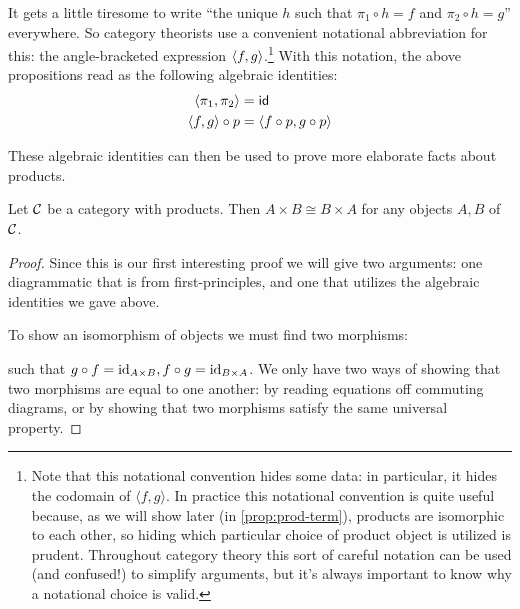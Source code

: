 It gets a little tiresome to write ``the unique \(h\) such that \(\pi_1 \circ h = f\)
and \(\pi_2 \circ h = g\)'' everywhere.
So category theorists use a convenient notational abbreviation
for this: the angle-bracketed expression \(\langle f,g\rangle\).\footnote{Note that 
this notational convention hides some data: in particular, 
it hides the codomain of $\langle f, g \rangle$. In practice this notational convention is quite useful 
because, as we will show later (in \cref{prop:prod-term}), products are 
isomorphic to each other, so hiding which particular choice of 
product object is utilized is prudent. Throughout category theory this 
sort of careful notation can be used (and confused!) to simplify arguments, but 
it's always important to know why a notational choice is valid.}
With this notation, the above propositions read as the following
algebraic identities:
\begin{align}
  \langle \pi_1,\pi_2\rangle &= \mathsf{id} \\
  \langle f,g\rangle\circ p &= \langle f\circ p, g \circ p\rangle
\end{align}

These algebraic identities can then be used to prove more elaborate facts about
products.

\begin{proposition} \label{prop:products-commutative}
  Let \(\mathcal C\) be a category with products.
  Then \(A\times B \cong B \times A\)
  for any objects \(A,B\) of \(\mathcal C\).
\end{proposition}
\begin{proof}
  Since this is our first interesting proof we will give two arguments: one diagrammatic 
  that is from first-principles, and one that utilizes the algebraic identities we gave above.

  To show an isomorphism of objects we must find two morphisms:
  
  \begin{center}
  \end{center}
such that $g \circ f = \operatorname{id}_{A \times B}, f \circ g = \operatorname{id}_{B \times A}$.
We only have two ways of showing that two morphisms are equal to one 
another: by reading equations off commuting diagrams, or by showing that 
two morphisms satisfy the same universal property.
\end{proof}

